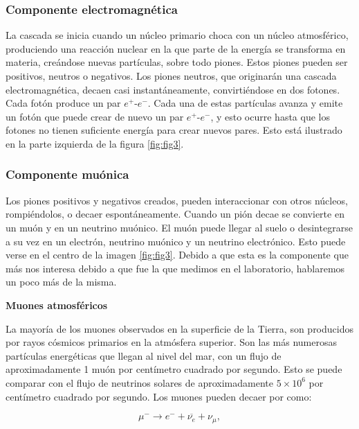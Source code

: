 \documentclass[a4paper,10pt]{article}
\numberwithin{equation}{section}
\begin{document}
\subsubsection{Componente electromagnética}

La cascada se inicia cuando un núcleo primario choca con un núcleo atmosférico, 
produciendo una reacción nuclear en la que parte de la energía se transforma en 
materia, creándose nuevas partículas, sobre todo piones. Estos piones pueden 
ser positivos, neutros o negativos. Los piones neutros, que originarán una 
cascada electromagnética, decaen casi instantáneamente, convirtiéndose 
en dos fotones. Cada fotón produce un par $e^+$-$e^-$. Cada una de estas partículas 
avanza y emite un fotón que puede crear de nuevo un par $e^+$-$e^-$, y esto ocurre 
hasta que los fotones no tienen suficiente energía para crear nuevos pares. Esto 
está ilustrado en la parte izquierda de la figura \eqref{fig:fig3}.

\subsubsection{Componente muónica}

Los piones positivos y negativos creados, pueden interaccionar con otros núcleos, 
rompiéndolos, o decaer espontáneamente. Cuando un pión decae se convierte en 
un muón y en un neutrino muónico. El muón puede llegar al suelo o desintegrarse 
a su vez en un electrón, neutrino muónico y un neutrino electrónico. Esto puede 
verse en el centro de la imagen \eqref{fig:fig3}. Debido a que esta es la componente 
que más nos interesa debido a que fue la que medimos en el laboratorio, hablaremos 
un poco más de la misma.

\vspace{.3cm}

\textbf{Muones atmosféricos}

\vspace{.3cm}

La mayoría de los muones observados en la superficie de la Tierra, son producidos 
por rayos cósmicos primarios en la atmósfera superior. Son las más numerosas 
partículas energéticas que llegan al nivel del mar, con un flujo de aproximadamente 
1 muón por centímetro cuadrado por segundo. Esto se puede comparar con el flujo de
neutrinos solares de aproximadamente $5\times 10^6$ por centímetro cuadrado por segundo. 
Los muones pueden decaer por como:

\begin{equation}
\mu^- \rightarrow e^- + \overline{\nu_e} + \nu_\mu,
\end{equation}
\end{document}

